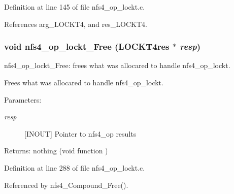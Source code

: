 Definition at line 145 of file nfs4\_\-op\_\-lockt.c.

References arg\_\-LOCKT4, and res\_\-LOCKT4.
\subsubsection{\setlength{\rightskip}{0pt plus 5cm}void nfs4\_\-op\_\-lockt\_\-Free (LOCKT4res $\ast$ {\em resp})}\label{nfs4__op__lockt_8c_a3}


nfs4\_\-op\_\-lockt\_\-Free: frees what was allocared to handle nfs4\_\-op\_\-lockt.

Frees what was allocared to handle nfs4\_\-op\_\-lockt.

\begin{Desc}
\item[Parameters:]
\begin{description}
\item[{\em resp}][INOUT] Pointer to nfs4\_\-op results\end{description}
\end{Desc}
\begin{Desc}
\item[Returns:]nothing (void function ) \end{Desc}


Definition at line 288 of file nfs4\_\-op\_\-lockt.c.

Referenced by nfs4\_\-Compound\_\-Free().